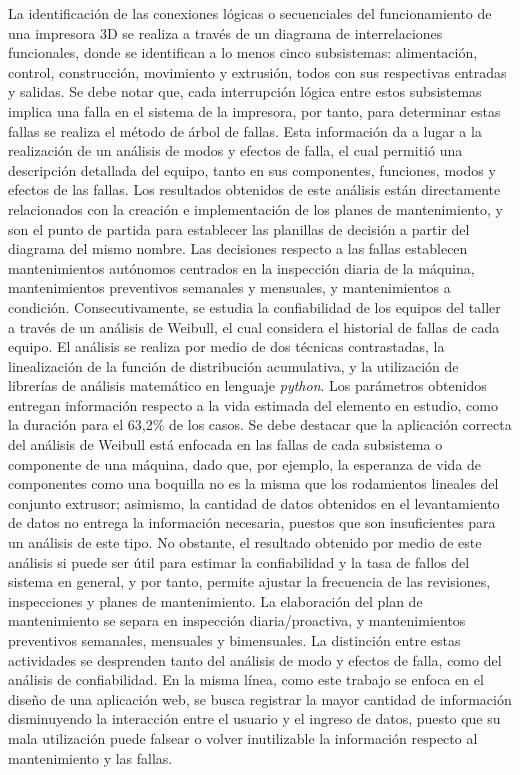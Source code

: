 La identificación de las conexiones lógicas o secuenciales del funcionamiento de una impresora 3D se realiza a través de un diagrama de interrelaciones funcionales, donde se identifican a lo menos cinco subsistemas: alimentación, control, construcción, movimiento y extrusión, todos con sus respectivas entradas y salidas. Se debe notar que, cada interrupción lógica entre estos subsistemas implica una falla en el sistema de la impresora, por tanto, para determinar estas fallas se realiza el método de árbol de fallas. Esta información da a lugar a la realización de un análisis de modos y efectos de falla, el cual permitió una descripción detallada del equipo, tanto en sus componentes, funciones, modos y efectos de las fallas. Los resultados obtenidos de este análisis están directamente relacionados con la creación e implementación de los planes de mantenimiento, y son el punto de partida para establecer las planillas de decisión a partir del diagrama del mismo nombre. Las decisiones respecto a las fallas establecen mantenimientos autónomos centrados en la inspección diaria de la máquina, mantenimientos preventivos semanales y mensuales, y mantenimientos a condición.
Consecutivamente, se estudia la confiabilidad de los equipos del taller a través de un análisis de Weibull, el cual considera el historial de fallas de cada equipo. El análisis se realiza por medio de dos técnicas contrastadas, la linealización de la función de distribución acumulativa, y la utilización de librerías de análisis matemático en lenguaje \textit{python}. Los parámetros obtenidos entregan información respecto a la vida estimada del elemento en estudio, como la duración para el 63,2\% de los casos. Se debe destacar que la aplicación correcta del análisis de Weibull está enfocada en las fallas de cada subsistema o componente de una máquina, dado que, por ejemplo, la esperanza de vida de componentes como una boquilla no es la misma que los rodamientos lineales del conjunto extrusor; asimismo, la cantidad de datos obtenidos en el levantamiento de datos no entrega la información necesaria, puestos que son insuficientes para un análisis de este tipo. No obstante, el resultado obtenido por medio de este análisis si puede ser útil para estimar la confiabilidad y la tasa de fallos del sistema en general, y por tanto, permite ajustar la frecuencia de las revisiones, inspecciones y planes de mantenimiento. 
La elaboración del plan de mantenimiento se separa en inspección diaria/proactiva, y mantenimientos preventivos semanales, mensuales y bimensuales. La distinción entre estas actividades se desprenden tanto del análisis de modo y efectos de falla, como del análisis de confiabilidad. En la misma línea, como este trabajo se enfoca en el diseño de una aplicación web, se busca registrar la mayor cantidad de información disminuyendo la interacción entre el usuario y el ingreso de datos, puesto que su mala utilización puede falsear o volver inutilizable la información respecto al mantenimiento y las fallas. 
